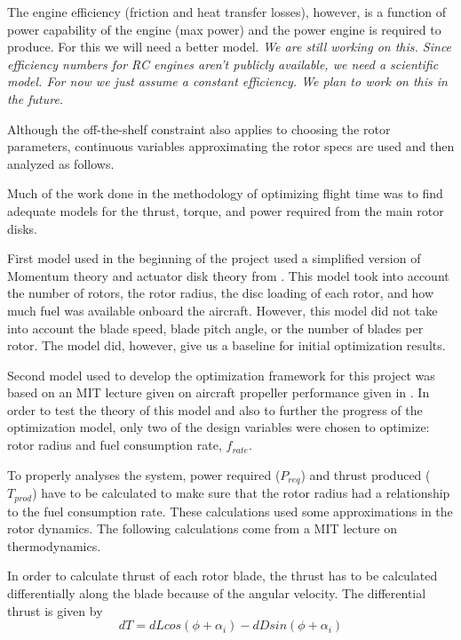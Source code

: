 \documentclass[letterpaper, 10 pt, conference]{ieeeconf}  %
\begin{document}
The engine efficiency (friction and heat transfer losses), however, is a function of power capability of the engine (max power) and the power engine is required to produce.  For this we will need a better model.  \textit{We are still working on this. Since efficiency numbers for RC engines aren't publicly available, we need a scientific model.  For now we just assume a constant efficiency. We plan to work on this in the future.} 

Although the off-the-shelf constraint also applies to choosing the rotor parameters, continuous variables approximating the rotor specs are used and then analyzed as follows. 

Much of the work done in the methodology of optimizing flight time was to find adequate models for the thrust, torque, and power required from the main rotor disks.

First model used in the beginning of the project used a simplified version of Momentum theory and actuator disk theory from \cite{helicopters2016}. This model took into account the number of rotors, the rotor radius, the disc loading of each rotor, and how much fuel was available onboard the aircraft. However, this model did not take into account the blade speed, blade pitch angle, or the number of blades per rotor. The model did, however, give us a baseline for initial optimization results.

Second model used to develop the optimization framework for this project was based on an MIT lecture given on aircraft propeller performance given in \cite{mit2016}. In order to test the theory of this model and also to further the progress of the optimization model, only two of the design variables were chosen to optimize: rotor radius and fuel consumption rate, $f_{rate}$. 

To properly analyses the system, power required ($P_{req}$) and thrust produced ($T_{prod}$) have to be calculated to make sure that the rotor radius had a relationship to the fuel consumption rate. These calculations used some approximations in the rotor dynamics. The following calculations come from a MIT lecture on thermodynamics.

In order to calculate thrust of each rotor blade, the thrust has to be calculated differentially along the blade because of the angular velocity. The differential thrust is given by 
\begin{equation}
	dT = dLcos(\phi + \alpha_i) - dDsin(\phi + \alpha_i)
\end{equation}
\end{document}

